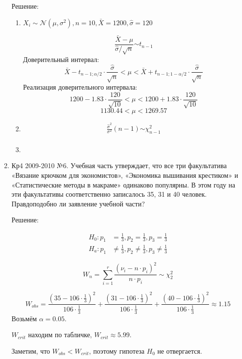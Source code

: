 \documentclass[a4paper,11pt]{article}
\newcommand{\cN}{\mathcal{N}}
\begin{document}
\begin{enumerate}
Решение:
\begin{enumerate}

\item
$X_i \sim \cN(\mu, \sigma^2), n = 10, \bar X = 1200, \hat{\sigma} = 120$

\[
\frac{\bar X - \mu}{\hat{\sigma} / \sqrt{n}} \stackrel{}{\sim} t_{n-1}
\]
Доверительный интервал:
\[
\bar X - t_{n-1; \alpha/2} \cdot \frac{\hat{\sigma}}{\sqrt{n}} < \mu < \bar X + t_{n-1; 1 - \alpha/2} \cdot \frac{\hat{\sigma}}{\sqrt{n}}
\]
Реализация доверительного интервала:
\[
1200 - 1.83 \cdot \frac{120}{\sqrt{10}} < \mu < 1200 + 1.83 \cdot \frac{120}{\sqrt{10}}
\]
\[
1130.44 < \mu < 1269.57
\]

\item

\begin{align*}
\frac{{\hat \sigma^2}}{\sigma^2} (n-1) \stackrel{}{\sim} \chi_{n-1}^2 \\
\end{align*}

\item
\end{enumerate}

\item Кр4 2009-2010 №6. Учебная часть утверждает, что все три факультатива «Вязание крючком для экономистов», «Экономика вышивания крестиком» и «Статистические методы в макраме» одинаково популярны. В этом году на эти факультативы соответственно записалось 35, 31 и 40 человек. Правдоподобно ли заявление учебной части?\label{Кр4 2009-2010 №6}

Решение:

\begin{align*}
	H_0: p_1 &= \frac{1}{3}, p_2 = \frac{1}{3},  p_3 = \frac{1}{3} \\
	H_a: p_1 &\neq \frac{1}{3}, p_2 \neq \frac{1}{3}, p_3 \neq \frac{1}{3}
\end{align*}

\[	
W_n = \sum_{i=1}^r\frac{(\nu_i - n \cdot p_i)^2}{n \cdot p_i}\sim \chi_2^2
\]

\[
W_{obs} = \frac{(35 - 106 \cdot \frac{1}{3})^2}{106 \cdot \frac{1}{3}} + \frac{(31 - 106 \cdot \frac{1}{3})^2}{106 \cdot \frac{1}{3}} + \frac{(40 - 106 \cdot \frac{1}{3})^2}{106 \cdot \frac{1}{3}} \approx 1.15
\]
Возьмём $\alpha = 0.05$.

$W_{crit}$ находим по табличке, $W_{crit} \approx 5.99$.

Заметим, что $W_{obs} < W_{crit}$, поэтому гипотеза $H_0$ не отвергается.


\end{enumerate}
\end{document}
